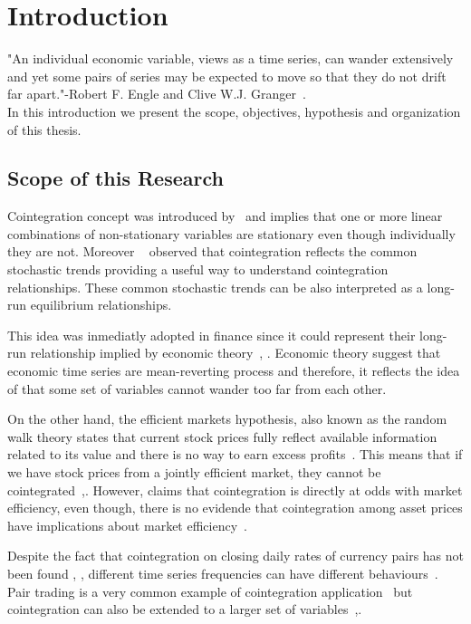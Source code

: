 \chapter{Introduction}\label{ch:introduction}

\vspace{0.5cm} 

"An individual economic variable, views as a time series, can wander extensively
and yet some pairs of series may be expected to move so that they do not drift
far apart."-Robert F. Engle and Clive W.J. Granger~\cite{engle1987}.\\
In this introduction we present the scope, objectives, hypothesis and organization of this thesis.

\section{Scope of this Research}

Cointegration concept was introduced by~\cite{engle1987} and implies that one or
more linear combinations of non-stationary variables are stationary even though
individually they are not.  Moreover ~\cite{stock+watson1988} observed that
cointegration reflects the common stochastic trends providing a useful way to
understand cointegration relationships. These common stochastic trends can be
also interpreted as a long-run equilibrium relationships.

This idea was inmediatly adopted in finance since it could represent their
long-run relationship implied by economic theory~\cite{laietAl1991},
\cite{lence+falk2005}.  Economic theory suggest that economic time series are
mean-reverting process and therefore, it reflects the idea of that some set of
variables cannot wander too far from each other. 

On the other hand, the efficient markets hypothesis, also known as the random
walk theory states that current stock prices fully reflect available
information related to its value and there is no way to earn excess
profits~\cite{fama1970}.  This means that if we have stock prices from a
jointly efficient market, they cannot be
cointegrated~\cite{granger1986},\cite{dwyer1992}. However, \cite{richards1995}
claims that cointegration is directly at odds with market efficiency, even
though, there is no evidende that cointegration among asset prices have
implications about market efficiency~\cite{lence+falk2005}.

Despite the fact that cointegration on closing daily rates of currency pairs has
not been found \cite{coleman1990}, \cite{copeland1991}, different time series
frequencies can have different behaviours~\cite{aldridge2009}. Pair trading is a
very common example of cointegration application~\cite{herlemont2003} 
but cointegration can also be extended to a larger set of
variables~\cite{mukherjee1995},\cite{engle2004}.

